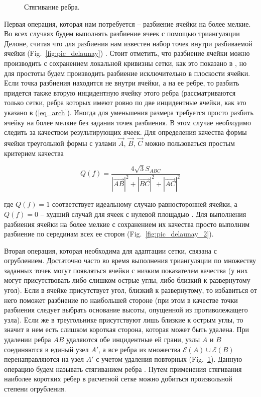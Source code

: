 \documentclass[
11pt,%
tightenlines,%
twoside,%
onecolumn,%
nofloats,%
nobibnotes,%
nofootinbib,%
superscriptaddress,%
noshowpacs,%
centertags]%
{revtex4}
\begin{document}
\begin{figure}[h]
\begin{minipage}[h]{0.28\textwidth}
    \caption{Стягивание ребра.}\label{fig:pic_reduce_edge}
  \end{minipage}
\end{figure}

Первая операция, которая нам потребуется -- разбиение ячейки на более мелкие.
Во всех случаях будем выполнять разбиение ячеек с помощью триангуляции Делоне, считая что для разбиения нам известен набор точек внутри разбиваемой ячейки (Fig.~\ref{fig:pic_delaunay}) \cite{Rivara}.
Стоит отметить, что разбиение ячейки можно производить с сохранением локальной кривизны сетки, как это показано в \cite{Rakotoarivelo}, но для простоты будем производить разбиение исключительно в плоскости ячейки.
Если точка разбиения находится не внутри ячейки, а на ее ребре, то разбить придется также вторую инцидентную ячейку этого ребра (рассматриваются только сетки, ребра которых имеют ровно по две инцидентные ячейки, как это указано в (\ref{eq_arch}).
Иногда для уменьшения размера требуется просто разбить ячейку на более мелкие без задания точек разбиения.
В этом случае необходимо следить за качеством результирующих ячеек.
Для определения качества формы ячейки треугольной формы с узлами $\vec{A}$, $\vec{B}$, $\vec{C}$ можно пользоваться простым критерием качества

\begin{equation}
Q(f) = \frac{4\sqrt{3} S_{ABC}}{|\vec{AB}|^2 + |\vec{BC}|^2 + |\vec{AC}|^2}
\end{equation}

где $Q(f) = 1$ соответствует идеальному случаю равносторонней ячейки, а $Q(f) = 0$ -- худший случай для ячеек с нулевой площадью \cite{Borouchaki}.
Для выполнения разбиения ячейки на более мелкие с сохранением их качества просто выполним разбиение по серединам всех ее сторон (Fig.~\ref{fig:pic_delaunay_2}).

Вторая операция, которая необходима для адаптации сетки, связана с огрублением.
Достаточно часто во время выполнения триангуляции по множеству заданных точек могут появляться ячейки с низким показателем качества (у них могут присутствовать либо слишком острые углы, либо близкий к развернутому угол).
Если в ячейке присутствует угол, близкий к развернутому, то избавиться от него поможет разбиение по наибольшей стороне (при этом в качестве точки разбиения следует выбрать основание высоты, опущенной из противолежащего узла).
Если же в треугольнике присутствуют лишь близкие к острым углы, то значит в нем есть слишком короткая сторона, которая может быть удалена.
При удалении ребра $AB$ удаляются обе инцидентные ей грани, узлы $A$ и $B$ соединяются в единый узел $A'$, а все ребра из множества $\mathscr{E}(A) \cup \mathscr{E}(B)$ перенаправляются на узел $A'$ с учетом удаления повторных (Fig.~\ref{fig:pic_reduce_edge}).
Данную операцию будем называть стягиванием ребра \cite{Panchal}.
Путем применения стягивания наиболее коротких ребер в расчетной сетке можно добиться произвольной степени огрубления.
\end{document}
